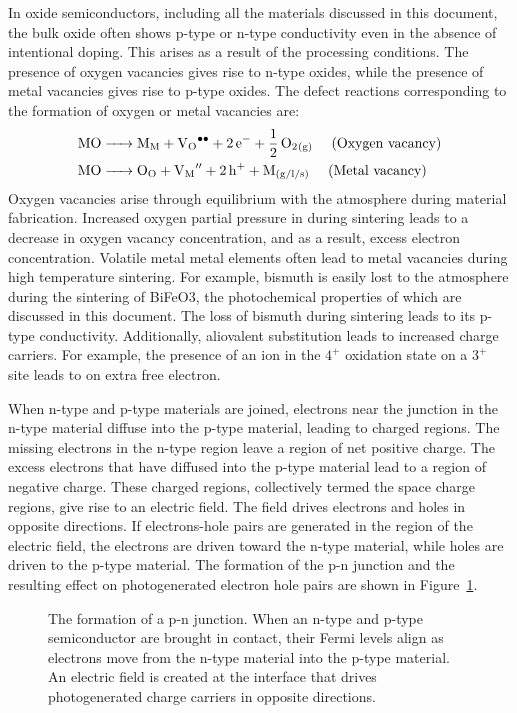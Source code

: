 \documentclass[12pt,%
              twoside,
               letterpaper]{uiothesis}
\begin{document}
In oxide semiconductors, including all the materials discussed in this document, the bulk
oxide often shows p-type or n-type conductivity even in the absence of intentional doping.
This arises as a result of the processing conditions. The presence of oxygen vacancies
gives rise to n-type oxides, while the presence of metal vacancies gives rise to p-type
oxides. The defect reactions corresponding to the formation of oxygen or metal vacancies
are:
\begin{align}
	\ce{MO}&\ce{-> M_M + V_O^{\bullet\bullet} + 2e- + 1/2O2_{(g)} \hspace{1em}
\text{(Oxygen~vacancy)}} \\
	\ce{MO}&\ce{-> O_O + V_M^{$\prime\prime$} + 2h+ + M_{(g/l/s)} \hspace{1em}
\text{(Metal~vacancy)}}
\end{align}
Oxygen vacancies arise through equilibrium with the atmosphere during material
fabrication. Increased oxygen partial pressure in during sintering leads to a decrease in
oxygen vacancy concentration, and as a result, excess electron concentration. Volatile
metal metal elements often lead to metal vacancies during high temperature sintering. For
example, bismuth is easily lost to the atmosphere during the sintering of BiFeO3, the
photochemical properties of which are discussed in this document. The loss of bismuth
during sintering leads to its p-type conductivity. Additionally, aliovalent substitution
leads to increased charge carriers. For example, the presence of an ion in the $4^{+}$
oxidation state on a $3^{+}$ site leads to on extra free electron.

When n-type and p-type materials are joined, electrons near the junction in the n-type
material diffuse into the p-type material, leading to charged regions. The missing
electrons in the n-type region leave a region of net positive charge. The excess electrons
that have diffused into the p-type material lead to a region of  negative charge. These
charged regions, collectively termed the space charge regions, give rise to an electric
field. The field drives electrons and holes in opposite directions. If electrons-hole
pairs are generated in the region of the electric field, the electrons are driven toward
the n-type material, while holes are driven to the p-type material. The formation of the
p-n junction and the resulting effect on photogenerated electron hole pairs are shown in
Figure~\ref{fig:pnjunction}.

\begin{figure}
		\caption[The formation of a p-n junction]{%
			The formation of a p-n junction. When an n-type and p-type 
			semiconductor are brought in contact, their Fermi levels 
			align as electrons move from the n-type material into the 
			p-type material. An electric field is created at the 
			interface that drives photogenerated charge carriers in 
			opposite directions.}
	\label{fig:pnjunction}
\end{figure}
\end{document}
